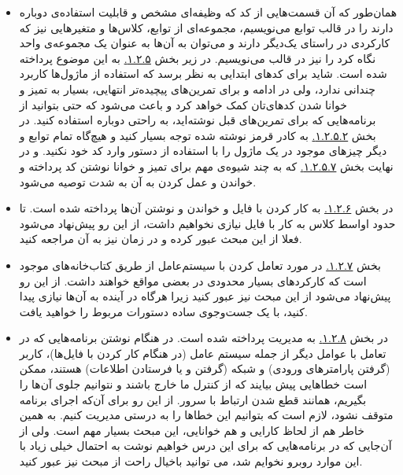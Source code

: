 \documentclass[11pt, a4paper]{article}
\newcommand{\code}[1]{\colorbox{codegray}{\lstinline{#1}}}
\begin{document}
\begin{itemize}[label=\Large $\bullet$]
  \item
  همان‌طور که آن قسمت‌هایی از کد که وظیفه‌ای مشخص و قابلیت استفاده‌ی دوباره دارند را در قالب توابع می‌نویسیم،
  مجموعه‌ای از توابع، کلاس‌ها و متغیرهایی نیز که کارکردی در راستای یک‌دیگر دارند
  و می‌توان به آن‌ها به عنوان یک مجموعه‌ی واحد نگاه کرد را نیز در قالب
  می‌نویسیم.
  در زیر بخش
  \href{https://scipy-lectures.org/intro/language/reusing_code.html}{۱.۲.۵.}
  به این موضوع پرداخته شده است.
  شاید برای کد‌های ابتدایی به نظر برسد که استفاده از ماژول‌ها کاربرد چندانی ندارد،
  ولی در ادامه و برای تمرین‌های پیچیده‌تر انتهایی،
  بسیار به تمیز و خوانا شدن کد‌های‌تان کمک خواهد کرد
  و باعث می‌شود که حتی بتوانید از برنامه‌هایی که برای تمرین‌های قبل نوشته‌اید،
  به راحتی دوباره استفاده کنید.
  در بخش
  \href{https://scipy-lectures.org/intro/language/reusing_code.html#importing-objects-from-modules}{۱.۲.۵.۲.}
  به کادر قرمز نوشته شده توجه بسیار کنید و هیچ‌گاه تمام توابع و دیگر‌ چیز‌های موجود در یک ماژول را با استفاده از دستور
  \lr{\code{from [module name] import *}}
  وارد کد خود نکنید.
  و در نهایت بخش
  \href{https://scipy-lectures.org/intro/language/reusing_code.html#good-practices}{۱.۲.۵.۷.}
  که به چند شیوه‌ی مهم برای تمیز و خوانا نوشتن کد پرداخته و خواندن و عمل کردن به‌ آن به شدت توصیه می‌شود.

  \item
  در بخش
  \href{https://scipy-lectures.org/intro/language/io.html}{۱.۲.۶.}
  به کار کردن با فایل و خواندن و نوشتن آن‌ها پرداخته شده است.
  تا حدود اواسط کلاس به کار با فایل نیازی نخواهیم داشت،
  از این رو پیش‌نهاد می‌شود فعلا از این مبحث عبور کرده و در زمان نیز به آن مراجعه کنید.

  \item
  بخش
  \href{https://scipy-lectures.org/intro/language/standard_library.html}{۱.۲.۷.}
  در مورد تعامل کردن با سیستم‌عامل از طریق کتاب‌خانه‌‌های موجود است که کارکردهای بسیار محدودی در بعضی مواقع خواهند داشت.
  از این رو پیش‌نهاد می‌شود از این مبحث نیز عبور کنید
  زیرا هرگاه در آینده به آن‌ها نیازی پیدا کنید، با یک جست‌وجو‌ی ساده دستورات مربوط را خواهید یافت.

  \item
  در بخش
  \href{https://scipy-lectures.org/intro/language/exceptions.html}{۱.۲.۸.}
  به مدیریت
  پرداخته شده است.
  در هنگام نوشتن برنامه‌هایی که در تعامل با عوامل دیگر از جمله سیستم عامل (در هنگام کار کردن با فایل‌ها)،
  کاربر (گرفتن پارامتر‌های ورودی)
  و شبکه (گرفتن و یا فرستادن اطلاعات)
  هستند،
  ممکن است خطاهایی پیش بیایند که از کنترل ما خارج باشند و نتوانیم جلوی آن‌ها را بگیریم،
  همانند قطع شدن ارتباط با سرور.
  از این رو برای آن‌که اجرای برنامه متوقف نشود،
  لازم است که بتوانیم این خطاها را به درستی مدیریت کنیم.
  به همین خاطر هم از لحاظ کارایی و هم خوانایی،
  این مبحث بسیار مهم است.
  ولی از آن‌جایی که در برنامه‌هایی که برای این درس خواهیم نوشت به احتمال خیلی زیاد با این موارد روبرو نخوایم شد،
  می توانید باخیال راحت از مبحث نیز عبور کنید.


\end{itemize}
\end{document}
